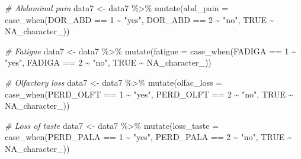 \documentclass[
]{article}
\newenvironment{Shaded}{\begin{snugshade}}{\end{snugshade}}
\newcommand{\AttributeTok}[1]{\textcolor[rgb]{0.77,0.63,0.00}{#1}}
\newcommand{\CommentTok}[1]{\textcolor[rgb]{0.56,0.35,0.01}{\textit{#1}}}
\newcommand{\ConstantTok}[1]{\textcolor[rgb]{0.00,0.00,0.00}{#1}}
\newcommand{\DecValTok}[1]{\textcolor[rgb]{0.00,0.00,0.81}{#1}}
\newcommand{\FunctionTok}[1]{\textcolor[rgb]{0.00,0.00,0.00}{#1}}
\newcommand{\NormalTok}[1]{#1}
\newcommand{\OtherTok}[1]{\textcolor[rgb]{0.56,0.35,0.01}{#1}}
\newcommand{\SpecialCharTok}[1]{\textcolor[rgb]{0.00,0.00,0.00}{#1}}
\newcommand{\StringTok}[1]{\textcolor[rgb]{0.31,0.60,0.02}{#1}}
\begin{document}
\begin{Shaded}
\begin{Highlighting}[]
\CommentTok{\# Abdominal pain}
\NormalTok{data7 }\OtherTok{\textless{}{-}}\NormalTok{  data7 }\SpecialCharTok{\%\textgreater{}\%}
  \FunctionTok{mutate}\NormalTok{(}\AttributeTok{abd\_pain =} \FunctionTok{case\_when}\NormalTok{(DOR\_ABD }\SpecialCharTok{==} \DecValTok{1} \SpecialCharTok{\textasciitilde{}} \StringTok{"yes"}\NormalTok{,}
\NormalTok{                              DOR\_ABD }\SpecialCharTok{==} \DecValTok{2} \SpecialCharTok{\textasciitilde{}} \StringTok{"no"}\NormalTok{,}
                              \ConstantTok{TRUE} \SpecialCharTok{\textasciitilde{}} \ConstantTok{NA\_character\_}\NormalTok{))}

\CommentTok{\# Fatigue}
\NormalTok{data7 }\OtherTok{\textless{}{-}}\NormalTok{  data7 }\SpecialCharTok{\%\textgreater{}\%}
  \FunctionTok{mutate}\NormalTok{(}\AttributeTok{fatigue =} \FunctionTok{case\_when}\NormalTok{(FADIGA }\SpecialCharTok{==} \DecValTok{1} \SpecialCharTok{\textasciitilde{}} \StringTok{"yes"}\NormalTok{,}
\NormalTok{                             FADIGA }\SpecialCharTok{==} \DecValTok{2} \SpecialCharTok{\textasciitilde{}} \StringTok{"no"}\NormalTok{,}
                             \ConstantTok{TRUE} \SpecialCharTok{\textasciitilde{}} \ConstantTok{NA\_character\_}\NormalTok{))}

\CommentTok{\# Olfactory loss}
\NormalTok{data7 }\OtherTok{\textless{}{-}}\NormalTok{  data7 }\SpecialCharTok{\%\textgreater{}\%}
  \FunctionTok{mutate}\NormalTok{(}\AttributeTok{olfac\_loss =} \FunctionTok{case\_when}\NormalTok{(PERD\_OLFT }\SpecialCharTok{==} \DecValTok{1} \SpecialCharTok{\textasciitilde{}} \StringTok{"yes"}\NormalTok{,}
\NormalTok{                                PERD\_OLFT }\SpecialCharTok{==} \DecValTok{2} \SpecialCharTok{\textasciitilde{}} \StringTok{"no"}\NormalTok{,}
                                \ConstantTok{TRUE} \SpecialCharTok{\textasciitilde{}} \ConstantTok{NA\_character\_}\NormalTok{))}

\CommentTok{\# Loss of taste}
\NormalTok{data7 }\OtherTok{\textless{}{-}}\NormalTok{  data7 }\SpecialCharTok{\%\textgreater{}\%}
  \FunctionTok{mutate}\NormalTok{(}\AttributeTok{loss\_taste =} \FunctionTok{case\_when}\NormalTok{(PERD\_PALA }\SpecialCharTok{==} \DecValTok{1} \SpecialCharTok{\textasciitilde{}} \StringTok{"yes"}\NormalTok{,}
\NormalTok{                                PERD\_PALA }\SpecialCharTok{==} \DecValTok{2} \SpecialCharTok{\textasciitilde{}} \StringTok{"no"}\NormalTok{,}
                                \ConstantTok{TRUE} \SpecialCharTok{\textasciitilde{}} \ConstantTok{NA\_character\_}\NormalTok{))}


\end{Highlighting}
\end{Shaded}
\end{document}

